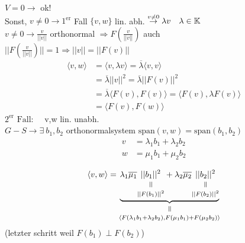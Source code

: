 \documentclass[titlepage,12pt,a4paper,ngerman]{report}
\newcommand{\verteq}{\rotatebox{90}{$\,=$}}
\newcommand{\equalto}[2]{\underset{\scriptstyle\overset{\mkern4mu\verteq}{#2}}{#1}}
\newcommand{\tx}[1]{\textrm{#1}}
\newcommand{\ub}[1]{\underbrace{#1}}
\newcommand{\spa}{\tx{span}}
\newcommand{\ska}[2]{\langle #1 , #2 \rangle}
\begin{document}
$ V = 0 \rightarrow $ ok!\\
Sonst, $ v \neq 0 \rightarrow 1^{\tx{er}} $ Fall $ \{v,w\} $ lin. abh. $ \buildrel v \neq 0 \over \rightarrow \lambda v \quad \lambda \in \mathbb{K} $ \\
$ v \neq 0 \rightarrow \frac{v}{||v||} $ orthonormal $ \Rightarrow F(\frac{v}{||v||}) $ auch\\
$ || F(\frac{v}{||v||})|| = 1 \Rightarrow ||v|| = ||F(v)||$
\begin{align*}
\ska{v}{w} &= \ska{v}{\lambda v} = \overline{\lambda} \ska{v}{v}\\
&= \overline{\lambda} ||v||^2 = \overline{\lambda} ||F(v)||^2\\ 
&= \overline{\lambda} \ska{F(v)}{F(v)} = \ska{F(v)}{\lambda F(v)}\\
&= \ska{F(v)}{F(w)}
\end{align*}
$\boxed{2^{\tx{er}} \tx{ Fall:}} \quad $  v,w lin. unabh.\\[5pt]
$ G - S \rightarrow \exists \ b_1, b_2 $ orthonormalsystem $ \spa(v,w) = \spa(b_1, b_2) $
\begin{align*}
v &= \lambda_1 b_1 + \lambda_2 b_2\\
w &= \mu_1 b_1 + \mu_2 b_2
\end{align*}

\begin{equation*}
\ska{v}{w} = \equalto{\ub{ \lambda_1 \overline{\mu_1} \equalto{||b_1||^2}{||F(b_1)||^2} + \lambda_2 \overline{\mu_2} \equalto{||b_2||^2}{||F(b_2)||^2}} }{\begin{Huge} \ska{F(\lambda_1 b_1 + \lambda_2 b_2)}{F(\mu_1 b_1 ) + F(\mu_2 b_2)} \end{Huge}}
\end{equation*}
(letzter schritt weil $ F(b_1) \perp F(b_2) $) 





	 
\end{document}
